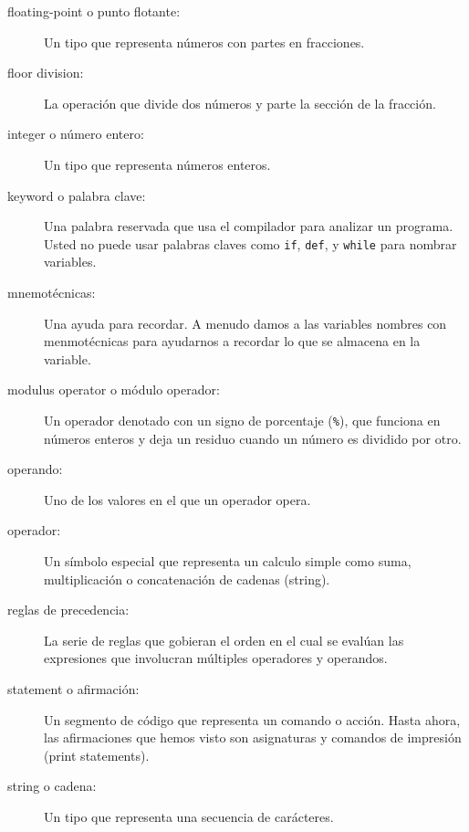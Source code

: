 \begin{ex}
\begin{description}
\item[floating-point o punto flotante:] Un tipo que representa n\'umeros con partes en fracciones.

\item[floor division:] La operaci\'on que divide dos n\'umeros y parte la secci\'on de la fracci\'on.

\item[integer o n\'umero entero:] Un tipo que representa n\'umeros enteros.

\item[keyword o palabra clave:]  Una palabra reservada que usa el compilador para analizar un programa. Usted no puede usar palabras claves como {\tt if}, {\tt  def}, y {\tt while} para nombrar
variables.

\item[mnemot\'ecnicas:] Una ayuda para recordar. A menudo damos a las variables nombres con menmot\'ecnicas para ayudarnos a recordar lo que se almacena en la variable.

\item[modulus operator o m\'odulo operador:]  Un operador denotado con un signo de porcentaje
({\tt \%}), que funciona en n\'umeros enteros y deja un residuo cuando un n\'umero es dividido por otro.

\item[operando:]  Uno de los valores en el que un operador opera.

\item[operador:]  Un s\'imbolo especial que representa un calculo simple como suma, multiplicaci\'on o concatenaci\'on de cadenas (string).

\item[reglas de precedencia:]  La serie de reglas que gobieran el orden en el cual se eval\'uan las expresiones que involucran m\'ultiples operadores y operandos.

\item[statement o afirmaci\'on:]  Un segmento de c\'odigo que representa un comando o acci\'on. Hasta ahora, las afirmaciones que hemos visto son asignaturas y comandos de impresi\'on (print statements).

\item[string o cadena:] Un tipo que representa una secuencia de car\'acteres.


\end{description}
\end{ex}
